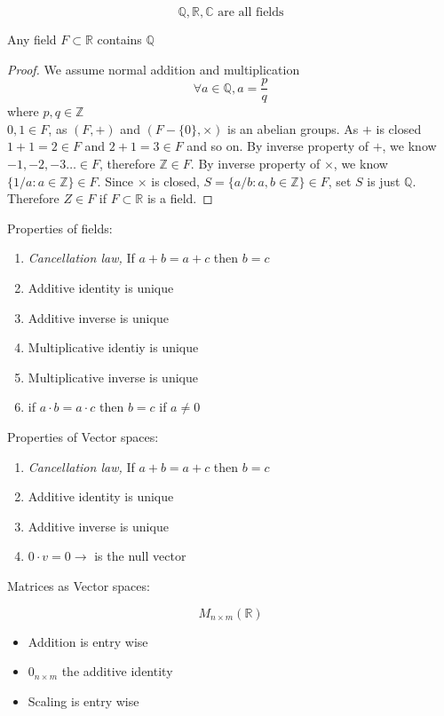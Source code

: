 \documentclass[11pt,a4paper]{colorart}
\def\l{\left}
\def\r{\right}
\def\R{\mathbb{R}}
\def\C{\mathbb{C}}
\def\Z{\mathbb{Z}}
\def\Q{\mathbb{Q}}
\begin{document}
\begin{example}
	\[ \Q, \R, \C \text{ are all fields}\]
\end{example}

\begin{proposition}
	Any field $ F\subset \R$ contains $\Q$
\end{proposition}

\begin{proof}
	We assume normal addition and multiplication
	\[ \forall a \in \Q, a = \frac{p}{q} \]
	where $p,q \in \Z$\\
	$0,1 \in F$, as $\l(F, +\r)$ and $\l(F-\{0\}, \times\r)$ is an abelian groups. 
	As $+$ is closed $1+1 = 2 \in F$ and $2+1=3 \in F$ and so on. 
	By inverse property of $+$, we know $-1,-2,-3 \dots\in F$, therefore $\Z\in F$. 
	By inverse property of $\times$, we know $\{1/a: a\in\Z\}\in F$.
	Since $\times$ is closed, $S=\{a/b: a,b \in\Z\}\in F$, set $S$ is just $\Q$. Therefore $Z\in F$ if $F \subset\R$ is a field.
	
\end{proof}

Properties of fields:

\begin{enumerate}
	\item \textit{Cancellation law,}
		If $a+b = a+c$ then $b=c$
	\item Additive identity is unique
	\item Additive inverse is unique
	\item Multiplicative identiy is unique
	\item Multiplicative inverse is unique
	\item 
		if $a\cdot b = a \cdot c$ then $b=c$ if $a \neq 0$
\end{enumerate}

Properties of Vector spaces:

\begin{enumerate}
	\item \textit{Cancellation law,}
		If $a+b = a+c$ then $b=c$
	\item Additive identity is unique
	\item Additive inverse is unique
	\item $0\cdot v = 0\rightarrow$ is the null vector
\end{enumerate}

Matrices as Vector spaces:

\[ M_{n\times m}\l(\R\r) \]

\begin{itemize}
	\item Addition is entry wise
	\item $0_{n\times m}$ the additive identity
	\item Scaling is entry wise
\end{itemize}
\end{document}

